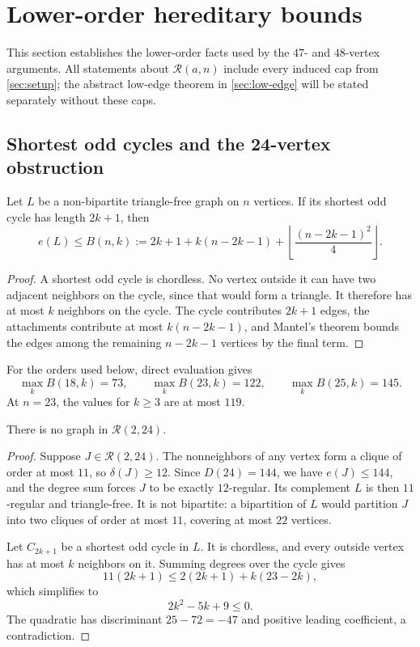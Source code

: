 \section{Lower-order hereditary bounds}
\label{sec:lower-order}

This section establishes the lower-order facts used by the $47$- and $48$-vertex arguments. All statements about $\mathcal R(a,n)$ include every induced cap from \cref{sec:setup}; the abstract low-edge theorem in \cref{sec:low-edge} will be stated separately without these caps.

\subsection{Shortest odd cycles and the 24-vertex obstruction}

\begin{lemma}
\label{lem:odd-cycle}
Let $L$ be a non-bipartite triangle-free graph on $n$ vertices. If its shortest odd cycle has length $2k+1$, then
\[
e(L)\le B(n,k):=2k+1+k(n-2k-1)+
\left\lfloor\frac{(n-2k-1)^2}{4}\right\rfloor.
\]
\end{lemma}

\begin{proof}
A shortest odd cycle is chordless. No vertex outside it can have two adjacent neighbors on the cycle, since that would form a triangle. It therefore has at most $k$ neighbors on the cycle. The cycle contributes $2k+1$ edges, the attachments contribute at most $k(n-2k-1)$, and Mantel's theorem \cite{Mantel1907} bounds the edges among the remaining $n-2k-1$ vertices by the final term.
\end{proof}

For the orders used below, direct evaluation gives
\[
\max_k B(18,k)=73,\qquad
\max_k B(23,k)=122,\qquad
\max_k B(25,k)=145.
\]
At $n=23$, the values for $k\geq3$ are at most $119$.

\begin{lemma}
\label{lem:R224}
There is no graph in $\mathcal R(2,24)$.
\end{lemma}

\begin{proof}
Suppose $J\in\mathcal R(2,24)$. The nonneighbors of any vertex form a clique of order at most $11$, so $\delta(J)\geq12$. Since $D(24)=144$, we have $e(J)\leq144$, and the degree sum forces $J$ to be exactly $12$-regular. Its complement $L$ is then $11$-regular and triangle-free. It is not bipartite: a bipartition of $L$ would partition $J$ into two cliques of order at most $11$, covering at most $22$ vertices.

Let $C_{2k+1}$ be a shortest odd cycle in $L$. It is chordless, and every outside vertex has at most $k$ neighbors on it. Summing degrees over the cycle gives
\[
11(2k+1)\leq 2(2k+1)+k(23-2k),
\]
which simplifies to
\[
2k^2-5k+9\leq0.
\]
The quadratic has discriminant $25-72=-47$ and positive leading coefficient, a contradiction.
\end{proof}

